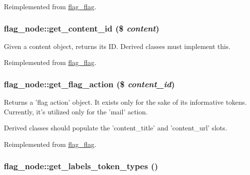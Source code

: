 Reimplemented from \hyperlink{classflag__flag_ed72cdfae0ffef546c45cfa0f616283a}{flag\_\-flag}.\hypertarget{classflag__node_7615ffc75f3b60c56032d7df1ad1e734}{
\subsubsection[{get\_\-content\_\-id}]{\setlength{\rightskip}{0pt plus 5cm}flag\_\-node::get\_\-content\_\-id (\$ {\em content})}}
\label{classflag__node_7615ffc75f3b60c56032d7df1ad1e734}


Given a content object, returns its ID. Derived classes must implement this.

Reimplemented from \hyperlink{classflag__flag_4da5889b258c2bc28b248678573b881a}{flag\_\-flag}.\hypertarget{classflag__node_124cd24063689c68b497c83707dc4f40}{
\subsubsection[{get\_\-flag\_\-action}]{\setlength{\rightskip}{0pt plus 5cm}flag\_\-node::get\_\-flag\_\-action (\$ {\em content\_\-id})}}
\label{classflag__node_124cd24063689c68b497c83707dc4f40}


Returns a 'flag action' object. It exists only for the sake of its informative tokens. Currently, it's utilized only for the 'mail' action.

Derived classes should populate the 'content\_\-title' and 'content\_\-url' slots. 

Reimplemented from \hyperlink{classflag__flag_532e58b6e71a0ef8f6bcb55607cbca8e}{flag\_\-flag}.\hypertarget{classflag__node_22f752cd73a076e6a36c76b6950e139f}{
\subsubsection[{get\_\-labels\_\-token\_\-types}]{\setlength{\rightskip}{0pt plus 5cm}flag\_\-node::get\_\-labels\_\-token\_\-types ()}}
\label{classflag__node_22f752cd73a076e6a36c76b6950e139f}



